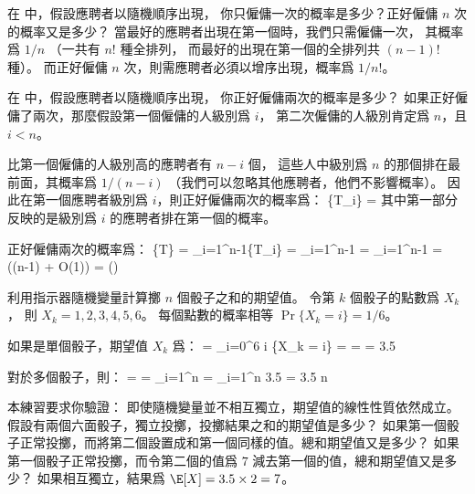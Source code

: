 \startsection[
  title={Indicator random variables},
]

\startEXERCISE
在  中，假設應聘者以隨機順序出現，
你只僱傭一次的概率是多少？正好僱傭 $n$ 次的概率又是多少？
\stopEXERCISE
\startANSWER
當最好的應聘者出現在第一個時，我們只需僱傭一次，
其概率爲 $1/n$ （一共有 $n!$ 種全排列，
而最好的出現在第一個的全排列共 $(n-1)!$ 種）。
而正好僱傭 $n$ 次，則需應聘者必須以增序出現，概率爲 $1/n!$。
\stopANSWER

\startEXERCISE
在  中，假設應聘者以隨機順序出現，
你正好僱傭兩次的概率是多少？
\stopEXERCISE
\startANSWER
如果正好僱傭了兩次，那麼假設第一個僱傭的人級別爲 $i$，
第二次僱傭的人級別肯定爲 $n$，且 $i < n$。

比第一個僱傭的人級別高的應聘者有 $n-i$ 個，
這些人中級別爲 $n$ 的那個排在最前面，其概率爲 $1/(n-i)$
（我們可以忽略其他應聘者，他們不影響概率）。
因此在第一個應聘者級別爲 $i$，則正好僱傭兩次的概率爲：
\startformula
\Pr\{T_i\} = 
\stopformula
其中第一部分反映的是級別爲 $i$ 的應聘者排在第一個的概率。

正好僱傭兩次的概率爲：
\startformula\startmathalignment
\NC \Pr\{T\} \NC= \sum_{i=1}^{n-1}\Pr\{T_i\} \NR
\NC        \NC= \sum_{i=1}^{n-1} \NR
\NC        \NC=  \sum_{i=1}^{n-1} \NR
\NC        \NC=  (\lg(n-1) + O(1)) \NR
\NC        \NC= \Omega()
\stopmathalignment\stopformula
\stopANSWER

\startEXERCISE
利用指示器隨機變量計算擲 $n$ 個骰子之和的期望值。
\stopEXERCISE
\startANSWER
令第 $k$ 個骰子的點數爲 $X_k$，
則 $X_k = 1,2,3,4,5,6$。
每個點數的概率相等 $\Pr\{X_k=i\}=1/6$。

如果是單個骰子，期望值 $X_k$ 爲：
\startformula\startmathalignment
\NC \E[X_k]
   \NC= \sum_{i=0}^6 i \Pr\{X_k = i\} \NR
\NC\NC=  \NR
\NC\NC=  \NR
\NC\NC= 3.5 \NR
\stopmathalignment\stopformula

對於多個骰子，則：
\startformula\startmathalignment
\NC \E[X] \NC= \E[\sum_{i=1}^nX_i] \NR
\NC      \NC= \sum_{i=1}^n \E[X_i] \NR
\NC      \NC= \sum_{i=1}^n 3.5 \NR
\NC      \NC= 3.5 \cdot n \NR
\stopmathalignment\stopformula
\stopANSWER

\startEXERCISE
本練習要求你驗證：
即使隨機變量並不相互獨立，期望值的線性性質依然成立。
假設有兩個六面骰子，獨立投擲，投擲結果之和的期望值是多少？
如果第一個骰子正常投擲，而將第二個設置成和第一個同樣的值。總和期望值又是多少？
如果第一個骰子正常投擲，而令第二個的值爲 $7$ 減去第一個的值，總和期望值又是多少？
\stopEXERCISE
\startANSWER
如果相互獨立，結果爲 $\E[X] = 3.5 \times 2 = 7$。

